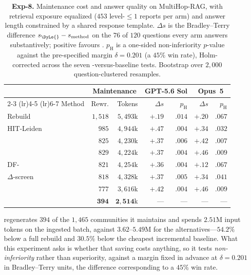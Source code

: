 \begin{table}[tb]\centering
\caption{\textbf{Exp-8.} Maintenance cost and answer quality on MultiHop-RAG,
with retrieval exposure equalized ($453$ level-$\le1$ reports per arm) and answer
length constrained by a shared response template. $\Delta s$ is the
Bradley--Terry difference $s_{\DyLo{}}-s_{\text{method}}$ on the $76$ of $120$
questions every arm answers substantively; positive favours \DyLo{}. $p_{\text{H}}$
is a one-sided non-inferiority $p$-value against the pre-specified margin
$\delta=0.201$ (a $45\%$ win rate), Holm-corrected across the seven
\DyLo{}-versus-baseline tests. Bootstrap over $2{,}000$ question-clustered
resamples.}
\label{tab:arena-matched}
\begin{footnotesize}
\setlength{\tabcolsep}{0.3em}
\begin{tabular}{lrr rr rr}
\toprule
& \multicolumn{2}{c}{Maintenance} & \multicolumn{2}{c}{GPT-5.6 Sol} & \multicolumn{2}{c}{Opus~5} \\
\cmidrule(lr){2-3} \cmidrule(lr){4-5} \cmidrule(lr){6-7}
Method & Rewr. & Tokens & $\Delta s$ & $p_{\text{H}}$ & $\Delta s$ & $p_{\text{H}}$ \\
\midrule
Rebuild         & $1{,}518$ & $5{,}493$k & $+.19$ & $.014$ & $+.20$ & $.067$ \\
HIT-Leiden      & $985$ & $4{,}944$k & $+.47$ & $.004$ & $+.34$ & $.032$ \\
\DynaMo{}       & $825$ & $4{,}230$k & $+.37$ & $.006$ & $+.42$ & $.007$ \\
\QCA{}          & $829$ & $4{,}224$k & $+.37$ & $.004$ & $+.46$ & $.009$ \\
DF-\Louvain{}   & $821$ & $4{,}254$k & $+.36$ & $.004$ & $+.12$ & $.067$ \\
$\Delta$-screen & $818$ & $4{,}328$k & $+.37$ & $.005$ & $+.34$ & $.041$ \\
\Batch{}        & $777$ & $3{,}616$k & $+.42$ & $.004$ & $+.46$ & $.009$ \\
\midrule
\DyLo{}         & $\mathbf{394}$ & $\mathbf{2{,}514}$k & --- & --- & --- & --- \\
\bottomrule
\end{tabular}
\end{footnotesize}
\end{table}

\DyLo{} regenerates $394$ of the $1{,}465$ communities it maintains and spends
$2.51$M input tokens on the ingested batch, against $3.62$--$5.49$M for the
alternatives---$54.2\%$ below a full rebuild and $30.5\%$ below the cheapest
incremental baseline. What this experiment asks is whether that saving costs
anything, so it tests \emph{non-inferiority} rather than superiority, against a
margin fixed in advance at $\delta=0.201$ in Bradley--Terry units, the difference
corresponding to a $45\%$ win rate.

